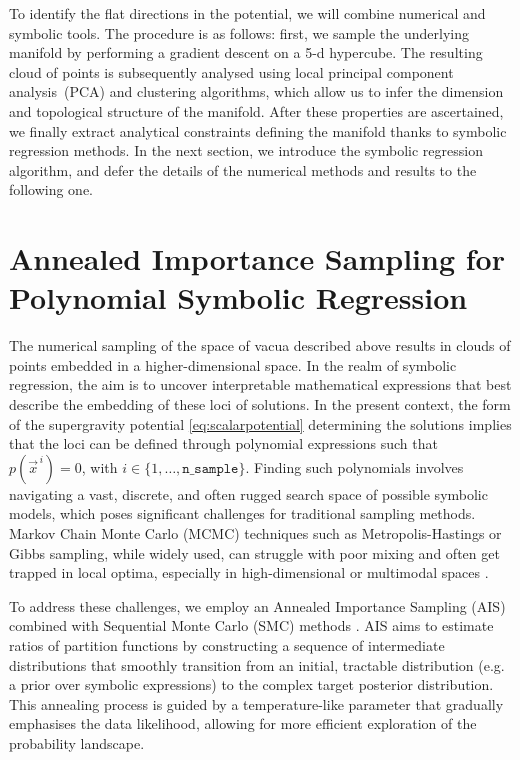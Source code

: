 \documentclass[11pt,a4paper]{article}
\begin{document}
To identify the flat directions in the potential, we will combine numerical and symbolic tools. The procedure is as follows: first, we sample the underlying manifold by performing a gradient descent on a 5-d hypercube. The resulting cloud of points is subsequently analysed using local principal component analysis~(PCA) and clustering algorithms, which allow us to infer the dimension and topological structure of the manifold. After these properties are ascertained, we finally extract analytical constraints defining the manifold thanks to symbolic regression methods. In the next section, we introduce the symbolic regression algorithm, and defer the details of the numerical methods and results to the following one.

\section{Annealed Importance Sampling for Polynomial Symbolic Regression} \label{Sec:AIS-SMC}
	

The numerical sampling of the space of vacua described above results in clouds of points embedded in a higher-dimensional space. 
In the realm of symbolic regression, the aim is to uncover interpretable mathematical expressions that best describe the embedding of these loci of solutions. 
In the present context, the form of the supergravity potential \eqref{eq:scalarpotential} determining the solutions implies that the loci can be defined through polynomial expressions such that $p(\vec{x}^{\,i}) = 0$, with $i \in \{1, \dots, \texttt{n\_{sample}}\}$. 
Finding such polynomials involves navigating a vast, discrete, and often rugged search space of possible symbolic models, which poses significant challenges for traditional sampling methods. 
Markov Chain Monte Carlo (MCMC) techniques such as Metropolis-Hastings or Gibbs sampling, while widely used, can struggle with poor mixing and often get trapped in local optima, especially in high-dimensional or multimodal spaces \cite{??}.

To address these challenges, we employ an Annealed Importance Sampling (AIS) \cite{neal1998annealedimportancesampling} combined with Sequential Monte Carlo (SMC) methods \cite{naesseth2024elementssequentialmontecarlo}. 
AIS aims to estimate ratios of partition functions by constructing a sequence of intermediate distributions that smoothly transition from an initial, tractable distribution (e.g. a prior over symbolic expressions) to the complex target posterior distribution. This annealing process is guided by a temperature-like parameter that gradually emphasises the data likelihood, allowing for more efficient exploration of the probability landscape. 
\end{document}
